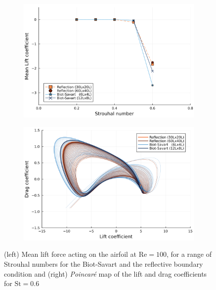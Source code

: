 \documentclass[final,1p,times]{elsarticle}
\begin{document}
\begin{figure}
    \centering
    \begin{subfigure}{.5\textwidth}
        \centering
        \includegraphics[trim={0 0 0 0},clip,width=\textwidth]{tex/fig/CL_mean_deflected_wake.png}
    \end{subfigure}%
    \begin{subfigure}{.5\textwidth}
        \centering
        \includegraphics[trim={0 0 0 0},clip,width=\textwidth]{tex/fig/poincare_deflected_wake.png}
    \end{subfigure}
    \caption{(left) Mean lift force acting on the airfoil at $\text{Re}=100$, for a range of Strouhal numbers for the Biot-Savart and the reflective boundary condition  and (right) \emph{Poincar\'e} map of the lift and drag coefficients for $\text{St}=0.6$}
    \label{fig:deflected_wake_2}
\end{figure}
\end{document}
